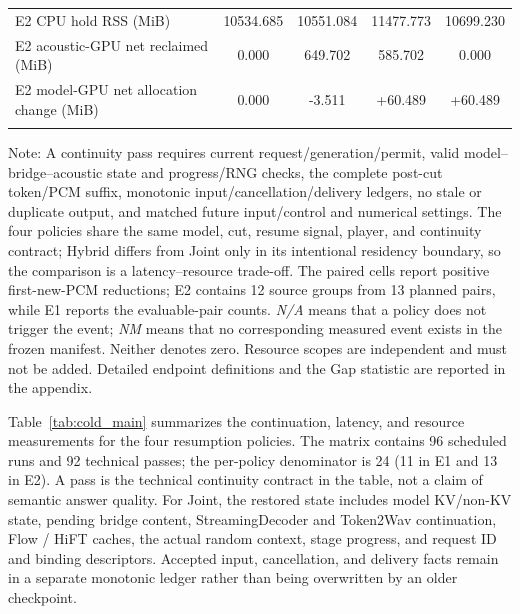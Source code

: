 \documentclass{article}
\begin{document}
\begin{table}[H]
{\begin{tabular}{@{}lcccc@{}}
E2 CPU hold RSS (MiB)
& 10534.685
& 10551.084
& 11477.773
& 10699.230 \\

E2 acoustic-GPU net reclaimed (MiB)
& 0.000
& 649.702
& 585.702
& 0.000 \\

E2 model-GPU net allocation change (MiB)
& 0.000
& -3.511
& +60.489
& +60.489 \\
\midrule
{} \\
\bottomrule
\end{tabular}
}%

\vspace{1mm}
\begin{flushleft}
\scriptsize
Note: A continuity pass requires current request/generation/permit, valid
model--bridge--acoustic state and progress/RNG checks, the complete post-cut
token/PCM suffix, monotonic input/cancellation/delivery ledgers, no stale or
duplicate output, and matched future input/control and numerical settings.
The four policies share the same model, cut, resume signal, player, and
continuity contract; Hybrid differs from Joint only in its intentional
residency boundary, so the comparison is a latency--resource trade-off.
The paired cells report positive first-new-PCM reductions; E2 contains 12
source groups from 13 planned pairs, while E1 reports the evaluable-pair
counts. \textit{N/A} means that a policy does not trigger the event;
\textit{NM} means that no corresponding measured event exists in the frozen
manifest. Neither denotes zero. Resource scopes are independent and must not
be added. Detailed endpoint definitions and the Gap statistic are reported
in the appendix.
\end{flushleft}
\end{table}
\FloatBarrier

Table~\ref{tab:cold_main} summarizes the continuation, latency, and
resource measurements for the four resumption policies. The matrix
contains 96 scheduled runs and 92 technical passes; the per-policy
denominator is 24 (11 in E1 and 13 in E2). A pass is the technical
continuity contract in the table, not a claim of semantic answer quality.
For Joint, the restored state includes model KV/non-KV state, pending
bridge content, StreamingDecoder and Token2Wav continuation, Flow / HiFT
caches, the actual random context, stage progress, and request ID
and binding descriptors. Accepted input, cancellation, and delivery
facts remain in a separate monotonic ledger rather than being overwritten
by an older checkpoint.
\end{document}
